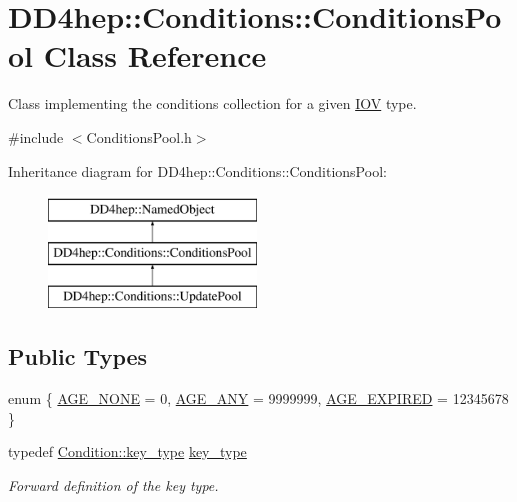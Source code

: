 \hypertarget{class_d_d4hep_1_1_conditions_1_1_conditions_pool}{}\section{D\+D4hep\+:\+:Conditions\+:\+:Conditions\+Pool Class Reference}
\label{class_d_d4hep_1_1_conditions_1_1_conditions_pool}


Class implementing the conditions collection for a given \hyperlink{class_d_d4hep_1_1_i_o_v}{I\+OV} type.  




{\ttfamily \#include $<$Conditions\+Pool.\+h$>$}

Inheritance diagram for D\+D4hep\+:\+:Conditions\+:\+:Conditions\+Pool\+:\begin{figure}[H]
\begin{center}
\leavevmode
\includegraphics[height=3.000000cm]{class_d_d4hep_1_1_conditions_1_1_conditions_pool}
\end{center}
\end{figure}
\subsection*{Public Types}
\begin{DoxyCompactItemize}
\item 
enum \{ \hyperlink{class_d_d4hep_1_1_conditions_1_1_conditions_pool_a3f11aa918cf5bb4fdc5958cfee1db0d6a2f31419779b9f1077b365a1619b33157}{A\+G\+E\+\_\+\+N\+O\+NE} = 0, 
\hyperlink{class_d_d4hep_1_1_conditions_1_1_conditions_pool_a3f11aa918cf5bb4fdc5958cfee1db0d6acf4756de3366a75476e4f4cc5c5c6c2b}{A\+G\+E\+\_\+\+A\+NY} = 9999999, 
\hyperlink{class_d_d4hep_1_1_conditions_1_1_conditions_pool_a3f11aa918cf5bb4fdc5958cfee1db0d6a8c256302f79cdb95e87657c7afd5d3ae}{A\+G\+E\+\_\+\+E\+X\+P\+I\+R\+ED} = 12345678
 \}
\item 
typedef \hyperlink{class_d_d4hep_1_1_conditions_1_1_condition_a7528efa762e8cc072ef80ea67c3531f9}{Condition\+::key\+\_\+type} \hyperlink{class_d_d4hep_1_1_conditions_1_1_conditions_pool_af0032de2b90b6bab00bf857f6078daaf}{key\+\_\+type}
\begin{DoxyCompactList}\small\item\em Forward definition of the key type. \end{DoxyCompactList}\end{DoxyCompactItemize}
